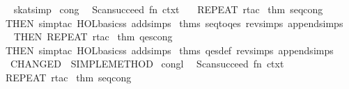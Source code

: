 \begin{isabellebody}
%
\isadelimproof
\ \ %
\endisadelimproof
%
\isatagproof
{}\isamarkupfalse%
\ skat{}simp%
\endisatagproof
{\isafoldproof}%
%
\isadelimproof
\isanewline
%
\endisadelimproof
%
\isadelimML
\isanewline
%
\endisadelimML
%
\isatagML
{}\isamarkupfalse%
\ cong\ {}\ {}\isanewline
Scan{}succeed\ {}fn\ ctxt\ {}{}\isanewline
\ \ REPEAT\ {}rtac\ %
\isaantiq
thm\ seq{}cong{}%
\endisaantiq
\ {}{}\isanewline
\ \ THEN\ simp{}tac\ {}HOL{}basic{}ss\ addsimps\ %
\isaantiq
thms\ seq{}to{}qes\ rev{}simps\ append{}simps{}%
\endisaantiq
{}\ {}\isanewline
\ \ THEN\ REPEAT\ {}rtac\ %
\isaantiq
thm\ qes{}cong{}%
\endisaantiq
\ {}{}\isanewline
\ \ THEN\ simp{}tac\ {}HOL{}basic{}ss\ addsimps\ %
\isaantiq
thms\ qes{}def\ rev{}simps\ append{}simps{}%
\endisaantiq
{}\ {}\isanewline
\ \ {}{}\ CHANGED\ {}{}\ SIMPLE{}METHOD{}\isanewline
{}\isanewline
\isanewline
{}\isamarkupfalse%
\ congl\ {}\ {}\isanewline
Scan{}succeed\ {}fn\ ctxt\ {}{}\isanewline
\ \ REPEAT\ {}rtac\ %
\isaantiq
thm\ seq{}cong{}%

\end{isabellebody}
